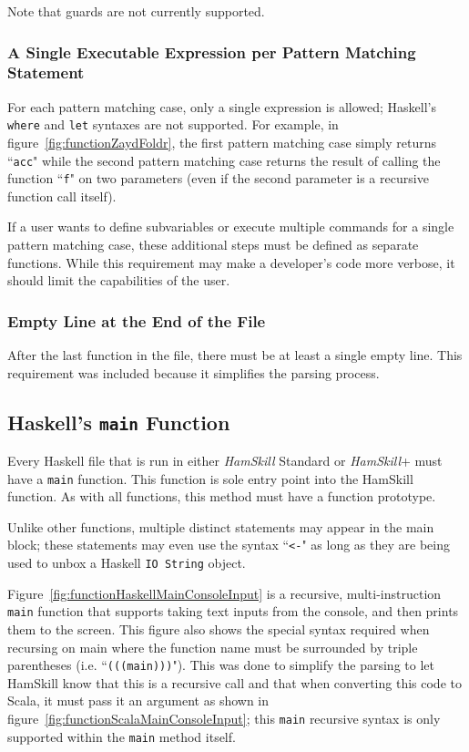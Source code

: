 \documentclass{report}
\begin{document}
Note that guards are not currently supported.

\subsubsection{A Single Executable Expression per Pattern Matching Statement}

For each pattern matching case, only a single expression is allowed; Haskell's \texttt{where} and \texttt{let} syntaxes are not supported.  For example, in figure~\ref{fig:functionZaydFoldr}, the first pattern matching case simply returns ``\texttt{acc}" while the second pattern matching case returns the result of calling the function ``\texttt{f}" on two parameters (even if the second parameter is a recursive function call itself).

If a user wants to define subvariables or execute multiple commands for a single pattern matching case, these additional steps must be defined as separate functions.  While this requirement may make a developer's code more verbose, it should limit the capabilities of the user.

\subsubsection{Empty Line at the End of the File}

After the last function in the file, there must be at least a single empty line.  This requirement was included because it simplifies the parsing process.

\subsection{Haskell's \texttt{main} Function}\label{sec:mainFunction}

Every Haskell file that is run in either \textit{HamSkill} Standard or \textit{HamSkill}+ must have a \texttt{main} function.  This function is sole entry point into the HamSkill function.  As with all functions, this method must have a function prototype.

Unlike other functions, multiple distinct statements may appear in the main block; these statements may even use the syntax ``\texttt{<-}" as long as they are being used to unbox a Haskell \texttt{IO String} object.

Figure~\ref{fig:functionHaskellMainConsoleInput} is a recursive, multi-instruction \texttt{main} function that supports taking text inputs from the console, and then prints them to the screen.  This figure also shows the special syntax required when recursing on main where the function name must be surrounded by triple parentheses (i.e. ``\texttt{(((main)))}").  This was done to simplify the parsing to let HamSkill know that this is a recursive call and that when converting this code to Scala, it must pass it an argument as shown in figure~\ref{fig:functionScalaMainConsoleInput}; this \texttt{main} recursive syntax is only supported within the \texttt{main} method itself.
\end{document}

